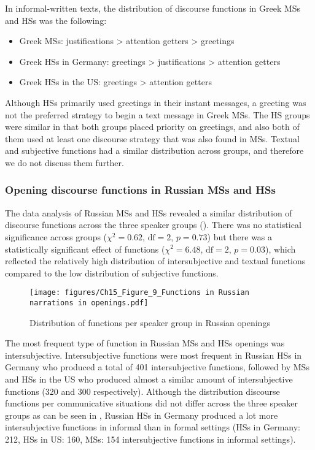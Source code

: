 \documentclass[output=paper,colorlinks,citecolor=brown]{langscibook}
\begin{document}
In informal-written texts, the distribution of discourse functions in Greek MSs and HSs was the following: 

\begin{itemize}
    \item Greek MSs: justifications > attention getters > greetings
    \item Greek HSs in Germany: greetings > justifications > attention getters
    \item Greek HSs in the US: greetings > attention getters
\end{itemize}

Although HSs primarily used greetings in their instant messages, a greeting was not the preferred strategy to begin a text message in Greek MSs. The HS groups were similar in that both groups placed priority on greetings, and also both of them used at least one discourse strategy that was also found in MSs. Textual and subjective functions had a similar distribution across groups, and therefore we do not discuss them further. 

\subsubsection{Opening discourse functions in Russian MSs and HSs} \label{sec:katsikaetal:Russianfunctionsopenings}
The data analysis of Russian MSs and HSs revealed a similar distribution of discourse functions across the three speaker groups (). There was no statistical significance across groups ($\chi^2 = 0.62$, $\text{df} = 2$, $p = 0.73$) but there was a statistically significant effect of functions ($\chi^2 = 6.48$, $\text{df} = 2$, $p = 0.03$), which reflected the relatively high distribution of intersubjective and textual functions compared to the low distribution of subjective functions.

\begin{figure}
    \centering
    \texttt{[image: figures/Ch15\_Figure\_9\_Functions in Russian narrations in openings.pdf]}
    \caption{Distribution of functions per speaker group in Russian openings}
    \label{fig:katsikaetal:Russianfunctionsopenings}
\end{figure}

The most frequent type of function in Russian MSs and HSs openings was intersubjective. Intersubjective functions were most frequent in Russian HSs in Germany who produced a total of 401 intersubjective functions, followed by MSs and HSs in the US who produced almost a similar amount of intersubjective functions (320 and 300 respectively). Although the distribution discourse functions per communicative situations did not differ across the three speaker groups as can be seen in , Russian HSs in Germany produced a lot more intersubjective functions in informal than in formal settings (HSs in Germany: 212, HSs in US: 160, MSs: 154 intersubjective functions in informal settings). 
\end{document}
